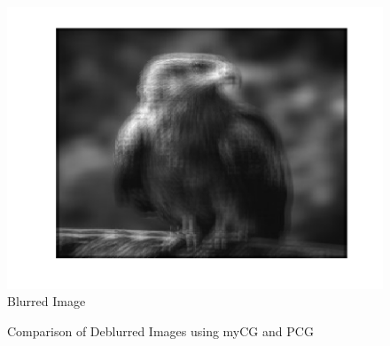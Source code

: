 \documentclass[unicode,11pt,a4paper,oneside,numbers=endperiod,openany]{scrartcl}
\begin{document}
\begin{figure}[H]
    \centering
    \includegraphics[width=0.6\linewidth]{graphs/blurred.png}
    \caption{Blurred Image}
    \label{fig:blurred}
\end{figure}

\begin{figure}[H]
    \centering
    \hfill
    \caption{Comparison of Deblurred Images using myCG and PCG}
    \label{fig:deblurred_comparison}
\end{figure}
\end{document}

